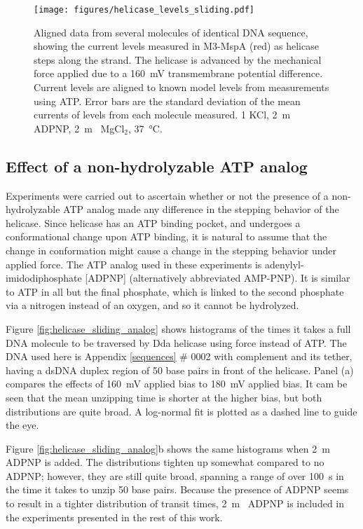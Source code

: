 \begin{figure}[h]
\begin{centering}
\texttt{[image: figures/helicase\_levels\_sliding.pdf]}
\caption[Mechanical force results in the same current levels]{Aligned data from several molecules of identical DNA sequence, showing the current levels measured in M3-MspA (red) as helicase steps along the strand.  The helicase is advanced by the mechanical force applied due to a \SI{160}{\mV} transmembrane potential difference.  Current levels are aligned to known model levels from measurements using ATP.  Error bars are the standard deviation of the mean currents of levels from each molecule measured.  \SI{1}{\Molar} KCl, \SI{2}{\m\Molar} ADPNP, \SI{2}{\m\Molar} MgCl$_2$, \SI{37}{\celsius}.}
\label{fig:helicase_force_stepping_2}
\end{centering}
\end{figure}

\subsection{Effect of a non-hydrolyzable ATP analog}

Experiments were carried out to ascertain whether or not the presence of a non-hydrolyzable ATP analog made any difference in the stepping behavior of the helicase.  Since helicase has an ATP binding pocket, and undergoes a conformational change upon ATP binding, it is natural to assume that the change in conformation might cause a change in the stepping behavior under applied force.  The ATP analog used in these experiments is adenylyl-imidodiphosphate [ADPNP] (alternatively abbreviated AMP-PNP).  It is similar to ATP in all but the final phosphate, which is linked to the second phosphate via a nitrogen instead of an oxygen, and so it cannot be hydrolyzed.

Figure \ref{fig:helicase_sliding_analog} shows histograms of the times it takes a full DNA molecule to be traversed by Dda helicase using force instead of ATP.  The DNA used here is Appendix \ref{sequences} \# 0002 with complement and its tether, having a dsDNA duplex region of \num{50} base pairs in front of the helicase.  Panel (a) compares the effects of \SI{160}{\mV} applied bias to \SI{180}{\mV} applied bias.  It cam be seen that the mean unzipping time is shorter at the higher bias, but both distributions are quite broad.  A log-normal fit is plotted as a dashed line to guide the eye.

Figure \ref{fig:helicase_sliding_analog}b shows the same histograms when \SI{2}{\m\Molar} ADPNP is added.  The distributions tighten up somewhat compared to no ADPNP; however, they are still quite broad, spanning a range of over \SI{100}{\s} in the time it takes to unzip \num{50} base pairs.  Because the presence of ADPNP seems to result in a tighter distribution of transit times, \SI{2}{\m\Molar} ADPNP is included in the experiments presented in the rest of this work.

